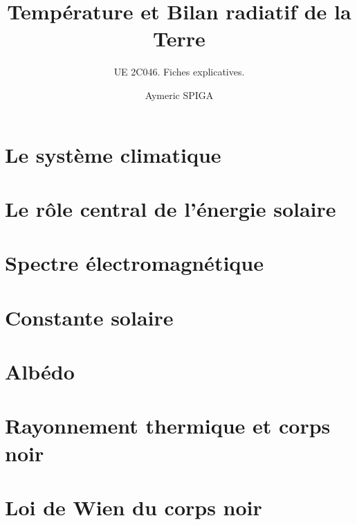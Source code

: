 \documentclass[
	a4paper,
	DIV16,
	10pt]{scrartcl}
\begin{document}
\subject{\texttt{[image: decouverte/logos/UPMC\_cart-blanc-Q\_7504-703-3.png]}}
\title{Température et Bilan radiatif de la Terre}
\subtitle{UE 2C046. Fiches explicatives.}
\author{Aymeric SPIGA}
\date{}
\publishers{\small Copie et usage interdits sans autorisation explicite de l'auteur.}

\maketitle

\newpage
\section{Le système climatique}


\newpage 
\section{Le rôle central de l'énergie solaire} 


\newpage 
\section{Spectre électromagnétique} 


\newpage 
\section{Constante solaire} 


\newpage 
\section{Albédo} 


\newpage 
\section{Rayonnement thermique et corps noir} 



\newpage
\section{Loi de Wien du corps noir}



\newpage
\end{document}
